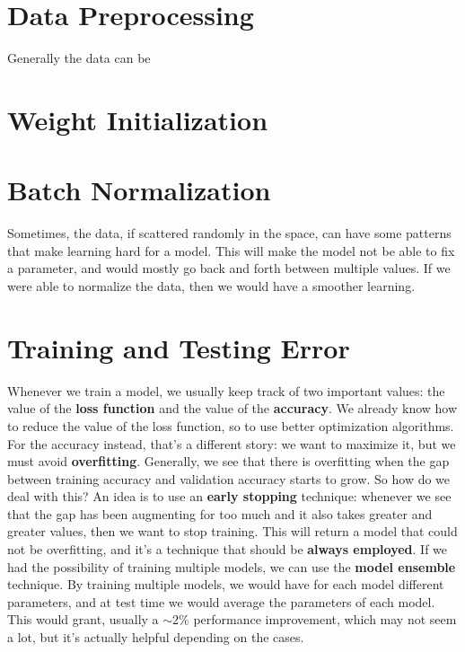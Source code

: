 \section{Data Preprocessing}

Generally the data can be

\section{Weight Initialization}

\pagebreak

\section{Batch Normalization}

Sometimes, the data, if scattered randomly in the space, can have some patterns that make learning hard for a model. This will make the model not be able to fix a parameter, and would mostly go back and forth between multiple values. If we were able to normalize the data, then we would have a smoother learning. 

\pagebreak

\section{Training and Testing Error}

Whenever we train a model, we usually keep track of two important values: the value of the \textbf{loss function} and the value of the \textbf{accuracy}. We already know how to reduce the value of the loss function, so to use better optimization algorithms. For the accuracy instead, that's a different story: we want to maximize it, but we must avoid \textbf{overfitting}. Generally, we see that there is overfitting when the gap between training accuracy and validation accuracy starts to grow.
\nwl
So how do we deal with this? An idea is to use an \textbf{early stopping} technique: whenever we see that the gap has been augmenting for too much and it also takes greater and greater values, then we want to stop training. This will return a model that could not be overfitting, and it's a technique that should be \textbf{always employed}.
\nwl
If we had the possibility of training multiple models, we can use the \textbf{model ensemble} technique. By training multiple models, we would have for each model different parameters, and at test time we would average the parameters of each model. This would grant, usually a $\sim 2\%$ performance improvement, which may not seem a lot, but it's actually helpful depending on the cases.

